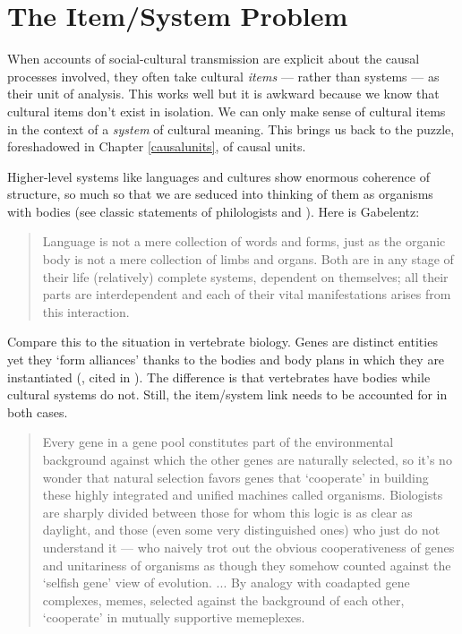 
\chapter{The Item/System Problem}
\label{itemsystemproblem}


When accounts of social-cultural transmission are explicit about the 
causal processes involved, they often take cultural \textit{
items} --- rather than systems --- as their unit of analysis. This works well 
but it is awkward because we know that cultural items don't exist in 
isolation. We can only make sense of cultural items in the context of a 
\textit{system} of cultural meaning. This brings us back to the puzzle, foreshadowed in Chapter \ref{causalunits}, of causal units. 



Higher-level systems like languages and cultures show enormous coherence 
of structure, so much so that we are seduced into thinking of them as organisms with 
bodies (see classic statements of philologists \citealt{gabelentz_sprachwissenschaft_1891} and \citealt[16]{meillet_linguistique_1926}). Here is Gabelentz:

\begin{quotation}
Language is not a mere collection of words and forms, just as the organic body is not a mere collection of limbs and organs. Both are in any stage of their life (relatively) complete systems, dependent on themselves; all their parts are interdependent and each of their vital manifestations arises from this interaction. \citep[10]{gabelentz_sprachwissenschaft_1891}
\end{quotation}

Compare this to the situation in vertebrate 
biology. Genes are distinct entities yet they \textquoteleft form 
alliances' thanks to the bodies and body plans in which they are 
instantiated (\citealt{gould_ontogeny_1977}, cited in \citealt[117]{dawkins_extended_1982}). The difference 
is that vertebrates have bodies while cultural systems 
do not. Still, the item/system link needs to be accounted for in both cases.

\begin{quotation}
Every gene in a gene pool constitutes part of the environmental background against which the other genes are naturally selected, so it's no wonder that natural selection favors genes that `cooperate' in building these highly integrated and unified machines called organisms.  Biologists are sharply divided between those for whom this logic is as clear as daylight, and those (even some very distinguished ones) who just do not understand it --- who naively trot out the obvious cooperativeness of genes and unitariness of organisms as though they somehow counted against the `selfish gene' view of evolution. ... By analogy with coadapted gene complexes, memes, selected against the background of each other, `cooperate' in mutually supportive memeplexes. \citep[xv]{DawkinsMemeForeword1999}
\end{quotation}


